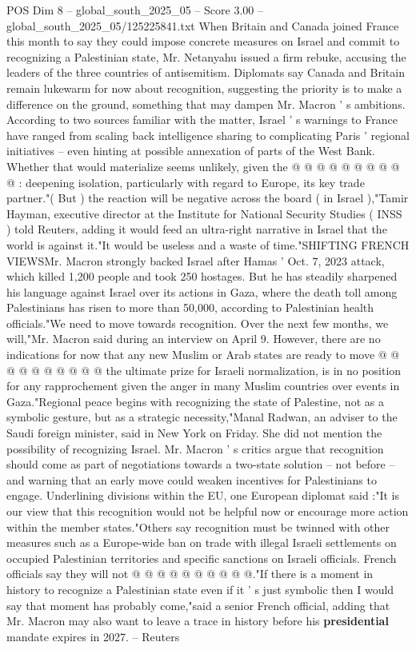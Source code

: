\begin{textsample}{POS Dim 8 – global\_south\_2025\_05 – Score 3.00 – global\_south\_2025\_05/125225841.txt}
When Britain and Canada joined France this month to say they could impose concrete measures on Israel and commit to recognizing a Palestinian state, Mr.
Netanyahu issued a firm rebuke, accusing the leaders of the three countries of antisemitism.
Diplomats say Canada and Britain remain lukewarm for now about recognition, suggesting the priority is to make a difference on the ground, something that may dampen Mr.
Macron ' s ambitions.
According to two sources familiar with the matter, Israel ' s warnings to France have ranged from scaling back intelligence sharing to complicating Paris ' regional initiatives -- even hinting at possible annexation of parts of the West Bank.
Whether that would materialize seems unlikely, given the @ @ @ @ @ @ @ @ @ @ : deepening isolation, particularly with regard to Europe, its key trade partner."( But ) the reaction will be negative across the board ( in Israel ),"Tamir Hayman, executive director at the Institute for National Security Studies ( INSS ) told Reuters, adding it would feed an ultra-right narrative in Israel that the world is against it."It would be useless and a waste of time."SHIFTING FRENCH VIEWSMr.
Macron strongly backed Israel after Hamas ' Oct. 7, 2023 attack, which killed 1,200 people and took 250 hostages.
But he has steadily sharpened his language against Israel over its actions in Gaza, where the death toll among Palestinians has risen to more than 50,000, according to Palestinian health officials."We need to move towards recognition.
Over the next few months, we will,"Mr.
Macron said during an interview on April 9.
However, there are no indications for now that any new Muslim or Arab states are ready to move @ @ @ @ @ @ @ @ @ @ the ultimate prize for Israeli normalization, is in no position for any rapprochement given the anger in many Muslim countries over events in Gaza."Regional peace begins with recognizing the state of Palestine, not as a symbolic gesture, but as a strategic necessity,"Manal Radwan, an adviser to the Saudi foreign minister, said in New York on Friday.
She did not mention the possibility of recognizing Israel.
Mr.
Macron ' s critics argue that recognition should come as part of negotiations towards a two-state solution -- not before -- and warning that an early move could weaken incentives for Palestinians to engage.
Underlining divisions within the EU, one European diplomat said :"It is our view that this recognition would not be helpful now or encourage more action within the member states."Others say recognition must be twinned with other measures such as a Europe-wide ban on trade with illegal Israeli settlements on occupied Palestinian territories and specific sanctions on Israeli officials.
French officials say they will not @ @ @ @ @ @ @ @ @ @."If there is a moment in history to recognize a Palestinian state even if it ' s just symbolic then I would say that moment has probably come,"said a senior French official, adding that Mr.
Macron may also want to leave a trace in history before his \textbf{presidential} mandate expires in 2027. -- Reuters

\end{textsample}

